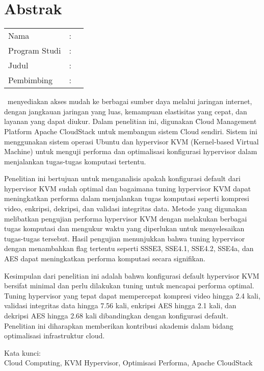 %
%
%

\chapter*{Abstrak}

\vspace*{0.2cm}
{
	\setlength{\parindent}{0pt}

	\begin{tabular}{@{}l l p{10cm}}
		Nama          & : & \penulis    \\
		Program Studi & : & \program    \\
		Judul         & : & \judul      \\
		Pembimbing    & : & \pembimbing \\
	\end{tabular}

	\bigskip
	\bigskip

	\cc\ menyediakan akses mudah ke berbagai sumber daya melalui jaringan internet, dengan jangkauan jaringan yang luas, kemampuan elastisitas yang cepat, dan layanan yang dapat diukur. Dalam penelitian ini, digunakan \f{Cloud Management Platform} Apache CloudStack untuk membangun sistem Cloud sendiri. Sistem ini menggunakan sistem operasi Ubuntu dan hypervisor KVM (Kernel-based Virtual Machine) untuk menguji performa dan optimalisasi konfigurasi hypervisor dalam menjalankan tugas-tugas komputasi tertentu.

	Penelitian ini bertujuan untuk menganalisis apakah konfigurasi default dari hypervisor KVM sudah optimal dan bagaimana tuning hypervisor KVM dapat meningkatkan performa dalam menjalankan tugas komputasi seperti kompresi video, enkripsi, dekripsi, dan validasi integritas data. Metode yang digunakan melibatkan pengujian performa hypervisor KVM dengan melakukan berbagai tugas komputasi dan mengukur waktu yang diperlukan untuk menyelesaikan tugas-tugas tersebut. Hasil pengujian menunjukkan bahwa tuning hypervisor dengan menambahkan flag tertentu seperti SSSE3, SSE4.1, SSE4.2, SSE4a, dan AES dapat meningkatkan performa komputasi secara signifikan.

	Kesimpulan dari penelitian ini adalah bahwa konfigurasi default hypervisor KVM bersifat minimal dan perlu dilakukan tuning untuk mencapai performa optimal. Tuning hypervisor yang tepat dapat mempercepat kompresi video hingga 2.4 kali, validasi integritas data hingga 7.56 kali, enkripsi AES hingga 2.1 kali, dan dekripsi AES hingga 2.68 kali dibandingkan dengan konfigurasi default. Penelitian ini diharapkan memberikan kontribusi akademis dalam bidang optimalisasi infrastruktur cloud.

	\bigskip

	Kata kunci:\\
	Cloud Computing, KVM Hypervisor, Optimisasi Performa, Apache CloudStack
}

\newpage